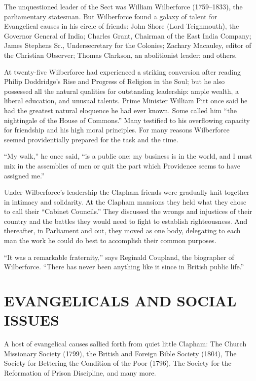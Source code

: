 The unquestioned leader of the Sect was William Wilberforce (1759–1833), the parliamentary
statesman. But Wilberforce found a galaxy of talent for Evangelical causes in his circle of friends:
John Shore (Lord Teignmouth), the Governor General of India; Charles Grant, Chairman of the East
India Company; James Stephens Sr., Undersecretary for the Colonies; Zachary Macauley, editor of the
Christian Observer; Thomas Clarkson, an abolitionist leader; and others.

At twenty-five Wilberforce had experienced a striking conversion after reading Philip Doddridge’s
Rise and Progress of Religion in the Soul; but he also possessed all the natural qualities for
outstanding leadership: ample wealth, a liberal education, and unusual talents. Prime Minister
William Pitt once said he had the greatest natural eloquence he had ever known. Some called him “the
nightingale of the House of Commons.” Many testified to his overflowing capacity for friendship and
his high moral principles. For many reasons Wilberforce seemed providentially prepared for the task
and the time.

“My walk,” he once said, “is a public one: my business is in the world, and I must mix in the
assemblies of men or quit the part which Providence seems to have assigned me.”

Under Wilberforce’s leadership the Clapham friends were gradually knit together in intimacy and
solidarity. At the Clapham mansions they held what they chose to call their “Cabinet Councils.” They
discussed the wrongs and injustices of their country and the battles they would need to fight to
establish righteousness. And thereafter, in Parliament and out, they moved as one body, delegating
to each man the work he could do best to accomplish their common purposes.

“It was a remarkable fraternity,” says Reginald Coupland, the biographer of Wilberforce. “There has
never been anything like it since in British public life.”

\section{EVANGELICALS AND SOCIAL ISSUES}

A host of evangelical causes sallied forth from quiet little Clapham: The Church Missionary Society
(1799), the British and Foreign Bible Society (1804), The Society for Bettering the Condition of the
Poor (1796), The Society for the Reformation of Prison Discipline, and many more.

